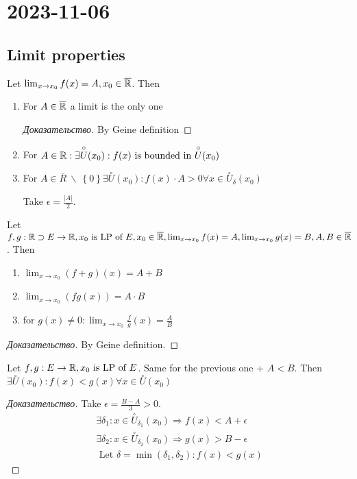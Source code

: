 \section{2023-11-06}

\subsection{Limit properties}


\begin{theorem}[Properties]
	Let $\lim_{x \to x_0} f(x) = A, x_0 \in \overline{\mathbb{R}}$. Then
	\begin{enumerate}
		\item For $A \in \overline{\mathbb{R}}$ a limit is the only one
			\begin{proof}[Доказательство]
				By Geine definition
			\end{proof}
	\item For $A \in \mathbb{R}: \exists \overset{\circ} U (x_0): f(x) \text{ is bounded in } \overset{\circ} U(x_0)$
	\item For $A \in \overline{R} \ \backslash \  \left\{ 0 \right \} \exists \overset{\circ} U (x_0): f(x) \cdot A > 0 \forall x \in \overset{\circ} U_\delta (x_0)$
		\begin{note}[]
			Take $\epsilon = \frac{|A|}{2}$.
		\end{note}
	\end{enumerate}
\end{theorem}
\begin{theorem}
	Let $f,g: \mathbb{R} \supset E \to \mathbb{R}, x_0 \text{ is LP of } E, x_0 \in \overline{\mathbb{R}}, \lim_{x \to x_0} f(x) = A, \lim_{x \to x_0} g(x) = B, A,B \in \overline{\mathbb{R}} $. Then 
	\begin{enumerate}
		\item $\lim_{x \to x_0} (f+g)(x) = A + B$
		\item $\lim_{x \to x_0} (fg(x)) = A \cdot B$
		\item for $g(x)  \neq 0: \lim_{x \to x_0} \frac{f}{g}(x) = \frac{A}{B}$ 
	\end{enumerate}
\end{theorem}

\begin{proof}[Доказательство]
	By Geine definition.
\end{proof}

\begin{theorem}[Inequalities]
	Let $f,g: E \to \mathbb{R}, x_0 \text{ is LP of } E$. Same for the previous one + $A < B$. Then $\exists \overset{\circ} U(x_0): f(x) < g(x) \forall x \in \overset{\circ} U(x_0)$
	\begin{proof}[Доказательство]
		Take $\epsilon = \frac{B - A}{3} > 0$. 
		 \begin{align*}
			 \exists \delta_1: x \in \overset{\circ} U_{\delta_1} (x_0) \Rightarrow f(x) < A + \epsilon \\
			 \exists \delta_2: x \in \overset{\circ} U_{\delta_2}(x_0) \Rightarrow g(x) > B - \epsilon \\
			\text{ Let } \delta = \min \left( \delta_1, \delta_2 \right): f(x) < g(x) 
		\end{align*}
	\end{proof}
\end{theorem}

